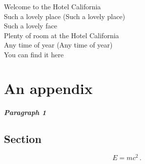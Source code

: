 \begin{savequote}[120mm]
Welcome to the Hotel California \\
Such a lovely place (Such a lovely place) \\
Such a lovely face \\
Plenty of room at the Hotel California \\
Any time of year (Any time of year) \\
You can find it here
\end{savequote}


\chapter{An appendix}
\label{appendix1}
\thispagestyle{fancy}

\textit{\lipsum[1]}


\paragraph{Paragraph 1}

\lipsum[2]


\section{Section}
\label{sectionA}

\begin{remark}[Name] 
\lipsum[1]
\begin{equation}
E = mc^2 \, .
\end{equation}
\end{remark}

\lipsum[4-7]
